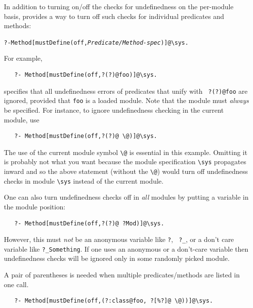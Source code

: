\documentclass[11pt]{article}
\newcommand{\ERGO}{\mbox{\smaller{\ensuremath{\cal{E}}\smaller{{\sc{RGO}}}}}\xspace}
\newcommand{\FLSYSTEM}{\ERGO}
\newcommand{\bs}{\textbackslash}
\begin{document}
In addition to turning on/off the checks for undefinedness on the per-module
basis, \FLSYSTEM provides a way to turn off such checks for individual
predicates and methods:
\begin{alltt}
   ?- Method[mustDefine(off,\mbox{\rm\emph{Predicate/Method-spec}})]@\bs{}sys.
\end{alltt}
For example, 
\begin{verbatim}
   ?- Method[mustDefine(off,?(?)@foo)]@\sys.
\end{verbatim}
specifies that all undefinedness errors of predicates that unify with {\tt
  ?(?)@foo} are ignored, provided that {\tt foo} is a loaded module. Note
that the module must \emph{always} be specified. For instance, to ignore
undefinedness checking in the current module, use
\begin{verbatim}
   ?- Method[mustDefine(off,?(?)@ \@)]@\sys.
\end{verbatim}
The use of the current module symbol {\tt \bs{}@} is essential in
this example. Omitting it is probably not what you want because
the module specification {\tt \bs{}sys} propagates inward and so the above
statement (without the {\tt \bs{}@}) would turn off undefinedness checks in
module {\tt \bs{}sys} instead of the current module.

One can also turn undefinedness checks off in \emph{all} modules by putting a
variable in the module position:
\begin{verbatim}
   ?- Method[mustDefine(off,?(?)@ ?Mod)]@\sys.
\end{verbatim}
However, this must \emph{not} be an anonymous variable like {\tt ?}, {\tt
  ?\_}, or a don't care variable like {\tt ?\_Something}.  If one uses an
anonymous or a don't-care variable then undefinedness checks will be ignored
only in some randomly picked module.

A pair of parentheses is needed when multiple
predicates/methods are listed in one call.
\begin{verbatim}
   ?- Method[mustDefine(off,(?:class@foo, ?[%?]@ \@))]@\sys.
\end{verbatim}
\end{document}
